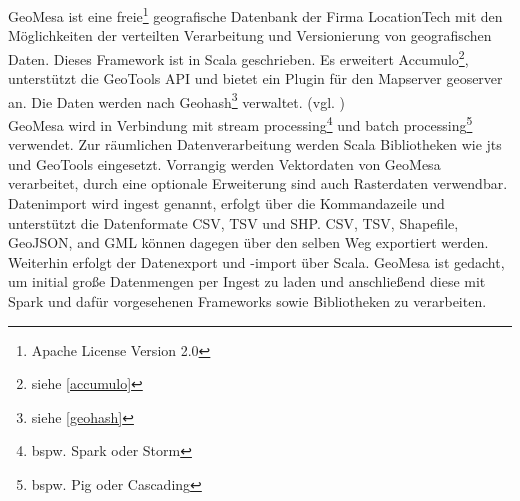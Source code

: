 GeoMesa ist eine freie\footnote{Apache License Version 2.0} geografische Datenbank der Firma LocationTech mit den Möglichkeiten der verteilten Verarbeitung und Versionierung von geografischen Daten.
Dieses Framework ist in Scala geschrieben.
Es erweitert Accumulo\footnote{siehe \ref{accumulo}}, unterstützt die GeoTools API und bietet ein Plugin für den Mapserver \Gls{geoserver} an.
Die Daten werden nach Geohash\footnote{siehe \ref{geohash}} verwaltet. (vgl. \cite{website:geomesaeclipse})\\
GeoMesa wird in Verbindung mit stream processing\footnote{bspw. Spark oder Storm} und batch processing\footnote{bspw. Pig oder Cascading} verwendet.
Zur räumlichen Datenverarbeitung werden Scala Bibliotheken wie \Gls{jts} und GeoTools eingesetzt.
Vorrangig werden Vektordaten von GeoMesa verarbeitet, durch eine optionale Erweiterung sind auch Rasterdaten verwendbar.
Datenimport wird ingest genannt, erfolgt über die Kommandazeile und unterstützt die Datenformate CSV, TSV und SHP.
CSV, TSV, Shapefile, GeoJSON, and GML können dagegen über den selben Weg exportiert werden.
Weiterhin erfolgt der Datenexport und -import über Scala.
GeoMesa ist gedacht, um initial große Datenmengen per Ingest zu laden und anschließend diese mit Spark und dafür vorgesehenen Frameworks sowie Bibliotheken zu verarbeiten.


%
%
%
%





